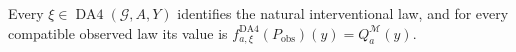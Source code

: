 Every \(\xi\in\operatorname{DA4}(\mathcal G,A,Y)\) identifies the natural interventional law, and for every compatible observed law its value is \(f^{\mathrm{DA4}}_{a,\xi}(P_{\mathrm{obs}})(y)=Q_a^{\mathcal M}(y)\).